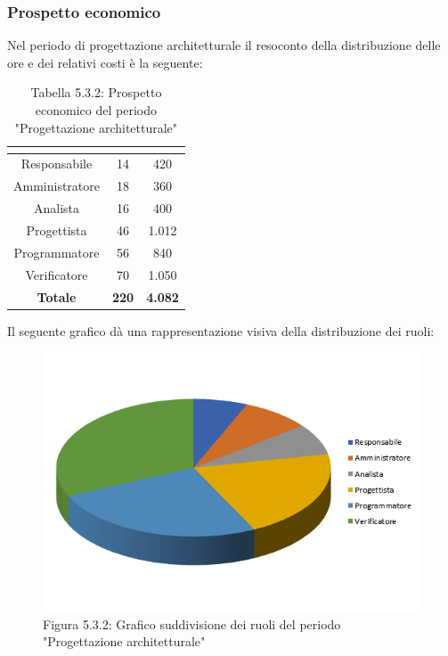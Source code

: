 \subsubsection{Prospetto economico}
Nel periodo di progettazione architetturale il resoconto della distribuzione delle ore e dei relativi costi è la seguente:

\renewcommand{\arraystretch}{1.5}
\begin{table}[H]
\begin{center}
\begin{tabular}{|c|c|c|}
\hline
\rowcolor{title_row}
\textbf{\color{title_text}{Ruolo}}  & \textbf{\color{title_text}{Ore}} & \textbf{\color{title_text}{Costo in \euro}} \\ \hline
Responsabile    & 14              & 420                     \\ \hline
Amministratore  & 18              & 360                   \\ \hline
Analista        & 16              & 400                    \\ \hline
Progettista     & 46              & 1.012                     \\ \hline
Programmatore   & 56              & 840                     \\ \hline
Verificatore    & 70              & 1.050                    \\ \hline
\textbf{Totale} & \textbf{220}    & \textbf{4.082}         \\ \hline
\end{tabular}
\caption{Tabella 5.3.2: Prospetto economico del periodo "Progettazione architetturale"\label{}}
\end{center}
\end{table}
\renewcommand{\arraystretch}{1}

Il seguente grafico dà una rappresentazione visiva della distribuzione dei ruoli: \\
\begin{figure} [H]
	\centering
	\includegraphics[scale=1]{Res/ExcelGrafici/Grafici/ProgettazioneRuoli.png}
	\caption{Figura 5.3.2: Grafico suddivisione dei ruoli del periodo "Progettazione architetturale"}\label{}
\end{figure}

\pagebreak
